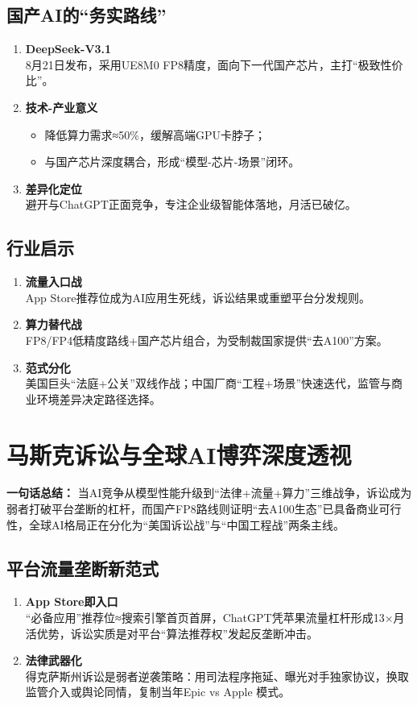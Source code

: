 \subsection{国产AI的“务实路线”}
\begin{enumerate}[leftmargin=*, nosep]
    \item \textbf{DeepSeek-V3.1}  \\
    8月21日发布，采用UE8M0 FP8精度，面向下一代国产芯片，主打“极致性价比”。
    \item \textbf{技术-产业意义}  
    \begin{itemize}[nosep]
        \item 降低算力需求≈50\%，缓解高端GPU卡脖子；  
        \item 与国产芯片深度耦合，形成“模型-芯片-场景”闭环。
    \end{itemize}
    \item \textbf{差异化定位}  \\
    避开与ChatGPT正面竞争，专注企业级智能体落地，月活已破亿。
\end{enumerate}

\subsection{行业启示}
\begin{enumerate}[leftmargin=*, nosep]
    \item \textbf{流量入口战}  \\
    App Store推荐位成为AI应用生死线，诉讼结果或重塑平台分发规则。
    \item \textbf{算力替代战}  \\
    FP8/FP4低精度路线+国产芯片组合，为受制裁国家提供“去A100”方案。
    \item \textbf{范式分化}  \\
    美国巨头“法庭+公关”双线作战；中国厂商“工程+场景”快速迭代，监管与商业环境差异决定路径选择。
\end{enumerate}

\section{马斯克诉讼与全球AI博弈深度透视}
\textbf{一句话总结：}  
当AI竞争从模型性能升级到“法律+流量+算力”三维战争，诉讼成为弱者打破平台垄断的杠杆，而国产FP8路线则证明“去A100生态”已具备商业可行性，全球AI格局正在分化为“美国诉讼战”与“中国工程战”两条主线。

\subsection{平台流量垄断新范式}
\begin{enumerate}[leftmargin=*, nosep]
    \item \textbf{App Store即入口}  \\
    “必备应用”推荐位≈搜索引擎首页首屏，ChatGPT凭苹果流量杠杆形成13×月活优势，诉讼实质是对平台“算法推荐权”发起反垄断冲击。
    \item \textbf{法律武器化}  \\
    得克萨斯州诉讼是弱者逆袭策略：用司法程序拖延、曝光对手独家协议，换取监管介入或舆论同情，复制当年Epic vs Apple 模式。
\end{enumerate}

